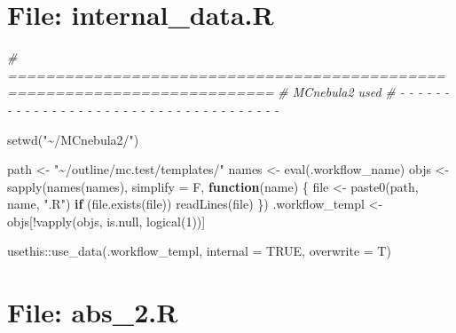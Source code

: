 \documentclass[
]{article}
\newenvironment{Shaded}{\begin{snugshade}}{\end{snugshade}}
\newcommand{\AttributeTok}[1]{\textcolor[rgb]{0.77,0.63,0.00}{#1}}
\newcommand{\CommentTok}[1]{\textcolor[rgb]{0.56,0.35,0.01}{\textit{#1}}}
\newcommand{\ConstantTok}[1]{\textcolor[rgb]{0.00,0.00,0.00}{#1}}
\newcommand{\ControlFlowTok}[1]{\textcolor[rgb]{0.13,0.29,0.53}{\textbf{#1}}}
\newcommand{\DecValTok}[1]{\textcolor[rgb]{0.00,0.00,0.81}{#1}}
\newcommand{\FunctionTok}[1]{\textcolor[rgb]{0.00,0.00,0.00}{#1}}
\newcommand{\NormalTok}[1]{#1}
\newcommand{\OtherTok}[1]{\textcolor[rgb]{0.56,0.35,0.01}{#1}}
\newcommand{\SpecialCharTok}[1]{\textcolor[rgb]{0.00,0.00,0.00}{#1}}
\newcommand{\StringTok}[1]{\textcolor[rgb]{0.31,0.60,0.02}{#1}}
\begin{document}
\hypertarget{file-internal_data.r}{%
\section{File: internal\_data.R}\label{file-internal_data.r}}

\begin{Shaded}
\begin{Highlighting}[]
\CommentTok{\# ==========================================================================}
\CommentTok{\# MCnebula2 used}
\CommentTok{\# {-} {-} {-} {-} {-} {-} {-} {-} {-} {-} {-} {-} {-} {-} {-} {-} {-} {-} {-} {-} {-} {-} {-} {-} {-} {-} {-} {-} {-} {-} {-} {-} {-} {-} {-} {-} {-}}

\FunctionTok{setwd}\NormalTok{(}\StringTok{"\textasciitilde{}/MCnebula2/"}\NormalTok{)}

\NormalTok{path }\OtherTok{\textless{}{-}} \StringTok{"\textasciitilde{}/outline/mc.test/templates/"}
\NormalTok{names }\OtherTok{\textless{}{-}} \FunctionTok{eval}\NormalTok{(.workflow\_name)}
\NormalTok{objs }\OtherTok{\textless{}{-}}
  \FunctionTok{sapply}\NormalTok{(}\FunctionTok{names}\NormalTok{(names), }\AttributeTok{simplify =}\NormalTok{ F,}
    \ControlFlowTok{function}\NormalTok{(name) \{}
\NormalTok{      file }\OtherTok{\textless{}{-}} \FunctionTok{paste0}\NormalTok{(path, name, }\StringTok{".R"}\NormalTok{)}
      \ControlFlowTok{if}\NormalTok{ (}\FunctionTok{file.exists}\NormalTok{(file))}
        \FunctionTok{readLines}\NormalTok{(file)}
\NormalTok{    \})}
\NormalTok{.workflow\_templ }\OtherTok{\textless{}{-}}\NormalTok{ objs[}\SpecialCharTok{!}\FunctionTok{vapply}\NormalTok{(objs, is.null, }\FunctionTok{logical}\NormalTok{(}\DecValTok{1}\NormalTok{))]}

\NormalTok{usethis}\SpecialCharTok{::}\FunctionTok{use\_data}\NormalTok{(.workflow\_templ, }\AttributeTok{internal =} \ConstantTok{TRUE}\NormalTok{, }\AttributeTok{overwrite =}\NormalTok{ T)}
\end{Highlighting}
\end{Shaded}

\hypertarget{file-abs_2.r}{%
\section{File: abs\_2.R}\label{file-abs_2.r}}
\end{document}
